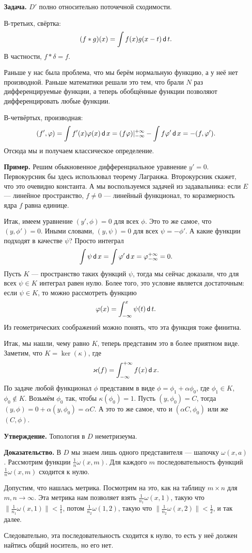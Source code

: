 \textbf{Задача.} $D'$ полно относительно поточечной сходимости.

В-третьих, свёртка:
\[
    (f * g)(x) = \int f(x) g(x - t) \operatorname{\mathsf d} t.
\]
В частности, $f * \delta = f$.

Раньше у нас была проблема, что мы берём нормальную функцию, а у неё нет производной.
Раньше математики решали это тем, что брали $N$ раз дифференцируемые функции, а теперь обобщённые функции позволяют дифференцировать любые функции.

В-четвёртых, производная:
\[
    (f', \varphi) = \int f'(x) \varphi(x) \operatorname{\mathsf d} x = (f\varphi)|_{-\infty}^{+\infty} -\int f \varphi' \operatorname{\mathsf d} x = -(f, \varphi').
\]
Отсюда мы и получаем классическое определение.

\textbf{Пример.} Решим обыкновенное дифференциальное уравнение $y' = 0$.
Первокурсник бы здесь использовал теорему Лагранжа.
Второкурсник скажет, что это очевидно константа.
А мы воспользуемся задачей из задавальника: если $E$ --- линейное пространство, $f \ne 0$ --- линейный функционал, то коразмерность ядра $f$ равна единице.

Итак, имеем уравнение $(y', \phi) = 0$ для всех $\phi$.
Это то же самое, что $(y, \phi') = 0$.
Иными словами, $(y, \psi) = 0$ для всех $\psi = - \phi'$.
А какие функции подходят в качестве $\psi$?
Просто интеграл
\[
    \int \psi \operatorname{\mathsf d} x = \int \varphi' \operatorname{\mathsf d} x = \varphi_{-\infty}^{+\infty} = 0.
\]
Пусть $K$ --- пространство таких функций $\psi$, тогда мы сейчас доказали, что для всех $\psi \in K$ интеграл равен нулю.
Более того, это условие является достаточным: если $\psi \in K$, то можно рассмотреть функцию
\[
    \varphi(x) = \int_{-\infty}^x \psi(t) \operatorname{\mathsf d} t.
\]
Из геометрических соображений можно понять, что эта функция тоже финитна.

Итак, мы нашли, чему равно $K$, теперь представим это в более приятном виде.
Заметим, что $K = \ker(\kappa)$, где
\[
    \varkappa(f) = \int_{-\infty}^{+\infty} f(x) \operatorname{\mathsf d} x.
\]
По задаче любой функционал $\phi$ представим в виде $\phi = \phi_1 + \alpha \phi_0$, где $\phi_1 \in K$, $\phi_0 \not\in K$.
Возьмём $\phi_0$ так, чтобы $\kappa(\phi_0) = 1$.
Пусть $(y, \phi_0) = C$, тогда $(y, \phi) = 0 + \alpha (y, \phi_0) = \alpha C$.
А это то же самое, что и $(\alpha C, \phi_0)$ или же $(C, \phi)$.

\textbf{Утверждение.} Топология в $D$ неметризеума.

\textbf{Доказательство.} В $D$ мы знаем лишь одного представителя --- шапочку $\omega(x, a)$.
Рассмотрим функции $\frac{1}{n} \omega(x, m)$.
Для каждого $m$ последовательность функций $\frac{1}{n} \omega(x, m)$ сходится к нулю.

Допустим, что нашлась метрика.
Посмотрим на это, как на таблицу $m \times n$ для $m, n \to \infty$.
Эта метрика нам позволяет взять $\frac{1}{n_1} \omega(x, 1)$, такую что $\|\frac{1}{n_1} \omega(x, 1)\| < \frac{1}{1}$, потом $\frac{1}{n_2} \omega(1, 2)$, такую что $\|\frac{1}{n_2} \omega(x, 2)\| < \frac{1}{2}$, и так далее.

Следовательно, эта последовательность сходится к нулю, то есть у неё должен найтись общий носитель, но его нет.

\QED
